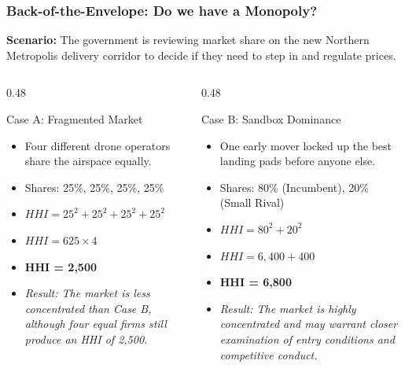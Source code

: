 \documentclass{beamer}
\begin{document}
\begin{frame}[t, shrink=10]
  \frametitle{Back-of-the-Envelope: Do we have a Monopoly?}
 
  \textbf{Scenario:} The government is reviewing market share on the new Northern Metropolis delivery corridor to decide if they need to step in and regulate prices.
  \vspace{0.3cm}
  \begin{columns}[T]
    \begin{column}{0.48\textwidth}
      \begin{block}{Case A: Fragmented Market}
      \begin{itemize}
          \item Four different drone operators share the airspace equally.
          \item Shares: 25\%, 25\%, 25\%, 25\%
          \item $HHI = 25^2 + 25^2 + 25^2 + 25^2$
          \item $HHI = 625 \times 4$
          \item \textbf{HHI = 2,500}
          \item \textit{Result: The market is less concentrated than Case B, although four equal firms still produce an HHI of 2,500.}
      \end{itemize}
      \end{block}
    \end{column}
    \begin{column}{0.48\textwidth}
      \begin{block}{Case B: Sandbox Dominance}
      \begin{itemize}
          \item One early mover locked up the best landing pads before anyone else.
          \item Shares: 80\% (Incumbent), 20\% (Small Rival)
          \item $HHI = 80^2 + 20^2$
          \item $HHI = 6,400 + 400$
          \item \textbf{HHI = 6,800}
          \item \textit{Result: The market is highly concentrated and may warrant closer examination of entry conditions and competitive conduct.}
      \end{itemize}
      \end{block}
    \end{column}
  \end{columns}
\end{frame}
\end{document}
